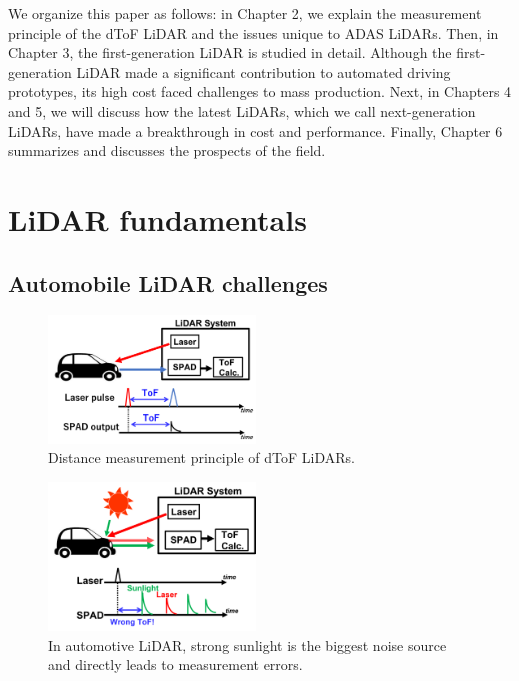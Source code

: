 \documentclass[paper]{ieice}
\begin{document}
We organize this paper as follows: in Chapter 2, we explain the measurement principle of the dToF LiDAR and the issues unique to ADAS LiDARs. Then, in Chapter 3, the first-generation LiDAR is studied in detail. Although the first-generation LiDAR made a significant contribution to automated driving prototypes, its high cost faced challenges to mass production. Next, in Chapters 4 and 5, we will discuss how the latest LiDARs, which we call next-generation LiDARs, have made a breakthrough in cost and performance. Finally, Chapter 6 summarizes and discusses the prospects of the field.

\section{LiDAR fundamentals}
\subsection{Automobile LiDAR challenges}
\begin{figure}[!t]
\centering
 \includegraphics[width=0.49\textwidth]{figs/lidar.png}
  \caption{Distance measurement principle of dToF LiDARs.}
\label{lidar}
\end{figure}

\begin{figure}[!t]
\centering
 \includegraphics[width=0.49\textwidth]{figs/sunlight.png}
  \caption{In automotive LiDAR, strong sunlight is the biggest noise source and directly leads to measurement errors.}
\label{sunlight}
\end{figure}
\end{document}
